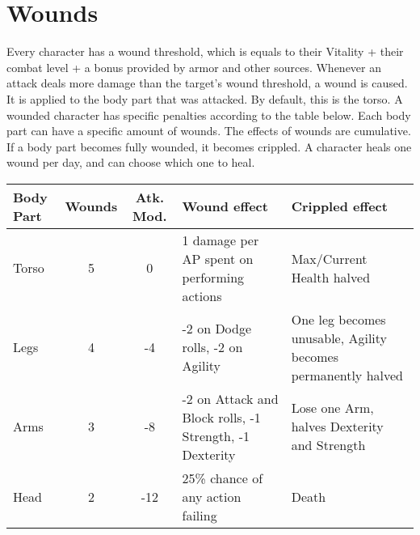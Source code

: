 \section{Wounds}
Every character has a wound threshold, which is equals to their Vitality + their combat level + a bonus provided by armor and other sources. Whenever an attack deals more damage than the target's wound threshold, a wound is caused. It is applied to the body part that was attacked. By default, this is the torso. A wounded character has specific penalties according to the table below. Each body part can have a specific amount of wounds. The effects of wounds are cumulative. If a body part becomes fully wounded, it becomes crippled.
A character heals one wound per day, and can choose which one to heal.


\begin{tabular}{p{1cm} | c | c | p{4cm} | p{4cm}}
Body Part & Wounds & Atk. Mod. & Wound effect & Crippled effect \\ \hline
Torso & 5 & 0 & 1 damage per AP spent on performing actions & Max/Current Health halved\\
Legs & 4 & -4 & -2 on Dodge rolls, -2 on Agility & One leg becomes unusable, Agility becomes permanently halved \\
Arms & 3 & -8 & -2 on Attack and Block rolls, -1 Strength, -1 Dexterity & Lose one Arm, halves Dexterity and Strength\\
Head & 2 & -12 & 25\% chance of any action failing & Death\\
\end{tabular}
